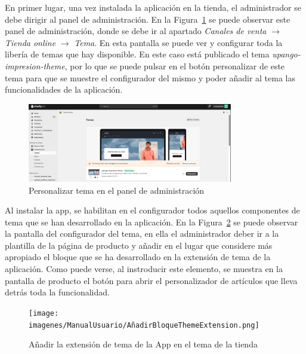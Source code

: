 \documentclass[12pt]{article}
\begin{document}
En primer lugar, una vez instalada la aplicación en la tienda, el administrador se debe dirigir al panel de administración. En la Figura~\ref{fig:PersonalizarTema} se puede observar este panel de administración, donde
se debe ir al apartado \textit{Canales de venta} $\rightarrow$  \textit{Tienda online} $\rightarrow$  \textit{Tema}. En esta pantalla se puede ver y configurar toda la libería de temas que hay disponible.
En este caso está publicado el tema \textit{upango-impresion-theme}, por lo que se puede pulsar en el botón personalizar de este tema para que se muestre el configurador del mismo y poder
añadir al tema las funcionalidades de la aplicación.

\begin{figure}[ht]
    \centering
    \includegraphics[width=0.8\textwidth]{imagenes/ManualUsuario/PantallaDePersonalizarTema.png}
    \caption{\label{fig:PersonalizarTema}Personalizar tema en el panel de administración}
    \vspace{\fill}
\end{figure}

Al instalar la app, se habilitan en el configurador todos aquellos componentes de tema que se han desarrollado en la aplicación.
En la Figura~\ref{fig:ThemeAppExtension} se puede observar la pantalla del configurador del tema, en ella el administrador deber ir a la plantilla de la página de producto y añadir
en el lugar que considere más apropiado el bloque que se ha desarrollado en la extensión de tema de la aplicación. Como puede verse, al instroducir este elemento, se muestra en la pantalla de producto
el botón para abrir el personalizador de artículos que lleva detrás toda la funcionalidad.

\begin{figure}[ht]
    \centering
    \texttt{[image: imagenes/ManualUsuario/AñadirBloqueThemeExtension.png]}
    \caption{\label{fig:ThemeAppExtension}Añadir la extensión de tema de la App en el tema de la tienda}
    \vspace{\fill}
\end{figure}
\end{document}
